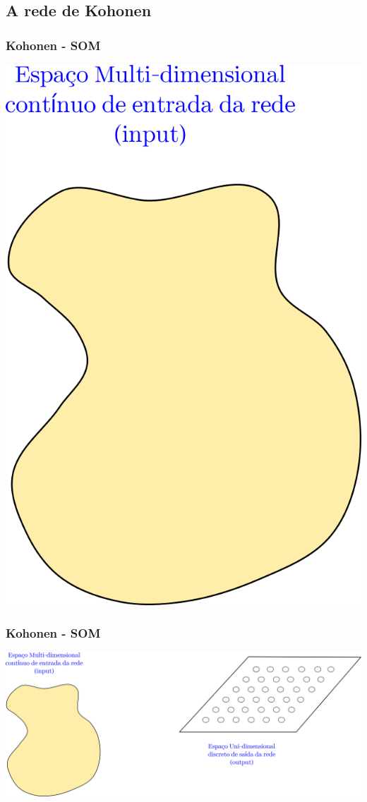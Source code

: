 \documentclass[aspectratio=10]{beamer} %
\begin{document}
\subsection{A rede de Kohonen}

\begin{frame}
  \frametitle{Kohonen - SOM}
  	 \includegraphics[scale=0.5]{Imagens/IntroKoho1.png} 
\end{frame}


\begin{frame}
 \frametitle{Kohonen - SOM}
 \includegraphics[scale=0.5]{Imagens/IntroKoho2.png} 
\end{frame}
\end{document}
